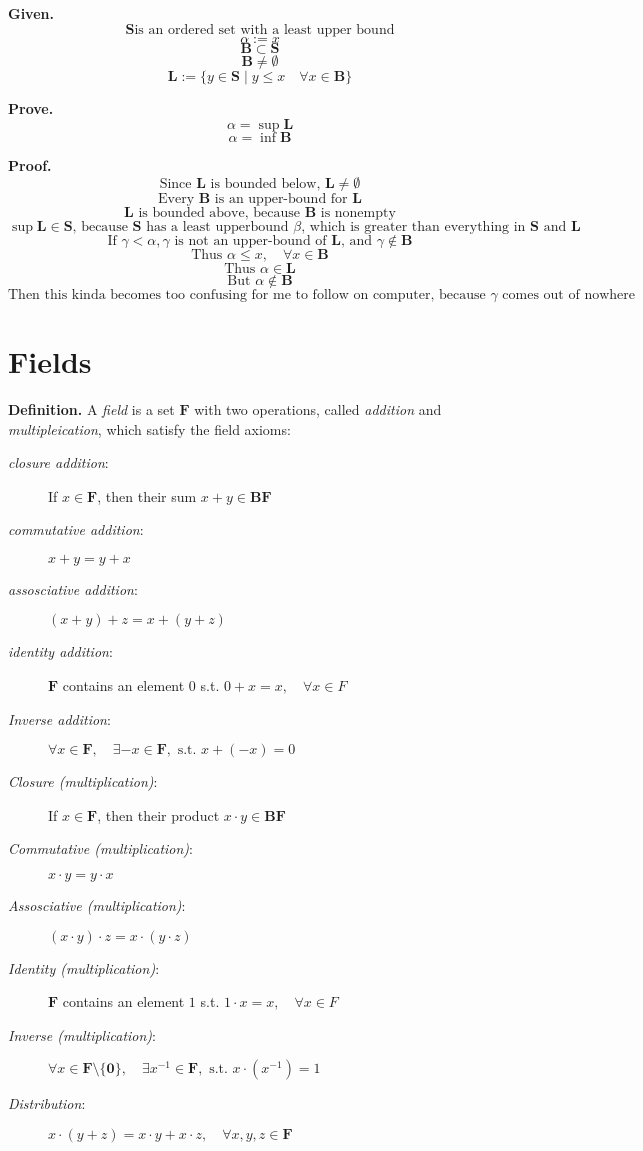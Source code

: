 \documentclass{article}
\newcommand{\set}[2]{
	\{ #1 \mid #2 \}
}
\begin{document}
{\bf Given.}
	$$ \mathbf{S} \text{is an ordered set with a least upper bound} $$
	$$ \alpha := x $$
	$$ \mathbf{B} \subset \mathbf{S} $$
	$$ \mathbf{B} \neq \emptyset $$
	$$ \mathbf{L} := \set{y \in \mathbf{S}}{y \leq x \quad \forall x \in \mathbf{B}} $$

{\bf Prove.}
	$$ \alpha = \sup\mathbf{L} $$
	$$ \alpha = \inf\mathbf{B} $$
	
{\bf Proof.}
	$$ \text{Since $\mathbf{L}$ is bounded below, } \mathbf{L} \neq \emptyset $$
	$$ \text{Every $\mathbf{B}$ is an upper-bound for $\mathbf{L}$} $$
	$$ \text{$\mathbf{L}$ is bounded above, because $\mathbf{B}$ is nonempty} $$
	$$ \sup\mathbf{L} \in \mathbf{S} \text{, because $\mathbf{S}$ has a least upperbound $\beta$, which is greater than everything in $\mathbf{S}$ and $\mathbf{L}$} $$
	$$ \text{If } \gamma < \alpha, \gamma \text{ is not an upper-bound of } \mathbf{L} \text{, and } \gamma \notin \mathbf{B} $$
	$$ \text{Thus } \alpha \leq x, \quad \forall x \in \mathbf{B} $$
	$$ \text{Thus } \alpha \in \mathbf{L} $$
	$$ \text{But } \alpha \notin \mathbf{B} $$
	$$ \text{Then this kinda becomes too confusing for me to follow on computer, because $\gamma$ comes out of nowhere} $$
	
\section{Fields}

{\bf Definition.}
	A \emph{field} is a set $\mathbf{F}$ with two operations, called \emph{addition} and \emph{multipleication}, which satisfy the field axioms:
	\begin{description}
		\item[\emph{closure addition}:]
			If $x \in \mathbf{F}$, then their sum $x + y \in \mathbf{BF}$
		\item[\emph{commutative addition}:]
			$x + y = y + x$
		\item[\emph{assosciative addition}:]
			$(x + y) + z = x + (y + z)$
		\item[\emph{identity addition}:]
			$\mathbf{F}$ contains an element $0$ s.t. $0 + x = x, \quad \forall x\in F$
		\item[\emph{Inverse addition}:]
			$\forall x \in \mathbf{F}, \quad \exists -x \in \mathbf{F}, \text{ s.t. } x + (-x) = 0$
		\item[\emph{Closure (multiplication)}:]
			If $x \in \mathbf{F}$, then their product $x \cdot y \in \mathbf{BF}$
		\item[\emph{Commutative (multiplication)}:]
			$x \cdot y = y \cdot x$
		\item[\emph{Assosciative (multiplication)}:]
			$(x \cdot y) \cdot z = x \cdot (y \cdot z)$
		\item[\emph{Identity (multiplication)}:]
			$\mathbf{F}$ contains an element $1$ s.t. $1 \cdot x = x, \quad \forall x\in F$
		\item[\emph{Inverse (multiplication)}:]
			$\forall x \in \mathbf{F\setminus\{0\}}, \quad \exists x^{-1} \in \mathbf{F}, \text{ s.t. } x \cdot (x^{-1}) = 1$
		\item[\emph{Distribution}:]
			$x \cdot (y + z) = x \cdot y + x \cdot z, \quad \forall x, y, z \in \mathbf{F}$
			
	\end{description}
\end{document}

